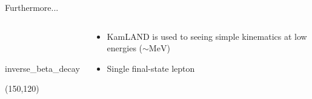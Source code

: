 \documentclass[14pt]{beamer}
\begin{document}
\begin{frame}[fragile]{Furthermore...}
	\centering
	\begin{columns}[t]
		\begin{block}{\\~\\}
			\centering
			\begin{fmffile}{inverse_beta_decay} \begin{fmfgraph*}(150,120)
				 
			\end{fmfgraph*} \end{fmffile}
		\end{block}
		\begin{block}{}
			\begin{itemize}
				\item<2-> KamLAND is used to seeing simple kinematics at low
					energies ($\sim\si{\mega\electronvolt}$)
				\item<3-> Single final-state lepton
			\end{itemize}
		\end{block}
	\end{columns}
\end{frame}
\end{document}
